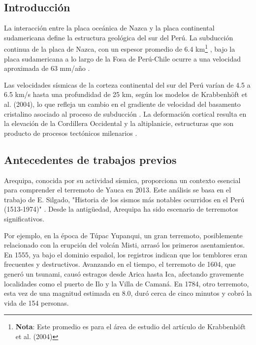 \documentclass[spanish,a4paper,11pt]{article}
\begin{document}
\subsection{Introducción}


La interacción entre la placa oceánica de Nazca y la placa continental sudamericana define la estructura geológica del sur del Perú. La subducción continua de la placa de Nazca, con un espesor promedio de 6.4 km\footnote{\textbf{Nota}: Este promedio es para el área de estudio del artículo de Krabbenhöft et al. (2004)} \cite{Krabbenhoft2004}, bajo la placa sudamericana a lo largo de la Fosa de Perú-Chile \cite{Krabbenhoft2004} ocurre a una velocidad aproximada de 63 mm/año \cite{VillegasLanza2016}.

Las velocidades sísmicas de la corteza continental del sur del Perú varían de 4.5 a 6.5 km/s hasta una profundidad de 25 km, según los modelos de Krabbenhöft et al. (2004), lo que refleja un cambio en el gradiente de velocidad del basamento cristalino asociado al proceso de subducción \cite{Krabbenhoft2004}. La deformación cortical resulta en la elevación de la Cordillera Occidental y la altiplanicie, estructuras que son producto de procesos tectónicos milenarios \cite{VillegasLanza2016}.

\subsection*{Antecedentes de trabajos previos}

Arequipa, conocida por su actividad sísmica, proporciona un contexto esencial para comprender el terremoto de Yauca en 2013. Este análisis se basa en el trabajo de E. Silgado, "Historia de los sismos más notables ocurridos en el Perú (1513-1974)" \cite{silgado_ferro_historia_1978}. Desde la antigüedad, Arequipa ha sido escenario de terremotos significativos.

Por ejemplo, en la época de Túpac Yupanqui, un gran terremoto, posiblemente relacionado con la erupción del volcán Misti, arrasó los primeros asentamientos. En 1555, ya bajo el dominio español, los registros indican que los temblores eran frecuentes y destructivos. Avanzando en el tiempo, el terremoto de 1604, que generó un tsunami, causó estragos desde Arica hasta Ica, afectando gravemente localidades como el puerto de Ilo y la Villa de Camaná. En 1784, otro terremoto, esta vez de una magnitud estimada en 8.0, duró cerca de cinco minutos y cobró la vida de 154 personas.
\end{document}
